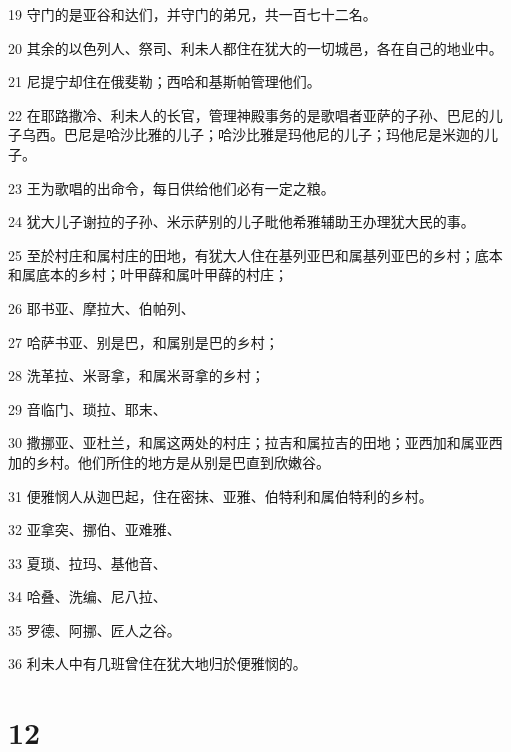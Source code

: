 \par 19 守门的是亚谷和达们，并守门的弟兄，共一百七十二名。
\par 20 其余的以色列人、祭司、利未人都住在犹大的一切城邑，各在自己的地业中。
\par 21 尼提宁却住在俄斐勒；西哈和基斯帕管理他们。
\par 22 在耶路撒冷、利未人的长官，管理神殿事务的是歌唱者亚萨的子孙、巴尼的儿子乌西。巴尼是哈沙比雅的儿子；哈沙比雅是玛他尼的儿子；玛他尼是米迦的儿子。
\par 23 王为歌唱的出命令，每日供给他们必有一定之粮。
\par 24 犹大儿子谢拉的子孙、米示萨别的儿子毗他希雅辅助王办理犹大民的事。
\par 25 至於村庄和属村庄的田地，有犹大人住在基列亚巴和属基列亚巴的乡村；底本和属底本的乡村；叶甲薛和属叶甲薛的村庄；
\par 26 耶书亚、摩拉大、伯帕列、
\par 27 哈萨书亚、别是巴，和属别是巴的乡村；
\par 28 洗革拉、米哥拿，和属米哥拿的乡村；
\par 29 音临门、琐拉、耶末、
\par 30 撒挪亚、亚杜兰，和属这两处的村庄；拉吉和属拉吉的田地；亚西加和属亚西加的乡村。他们所住的地方是从别是巴直到欣嫩谷。
\par 31 便雅悯人从迦巴起，住在密抹、亚雅、伯特利和属伯特利的乡村。
\par 32 亚拿突、挪伯、亚难雅、
\par 33 夏琐、拉玛、基他音、
\par 34 哈叠、洗编、尼八拉、
\par 35 罗德、阿挪、匠人之谷。
\par 36 利未人中有几班曾住在犹大地归於便雅悯的。

\chapter{12}

